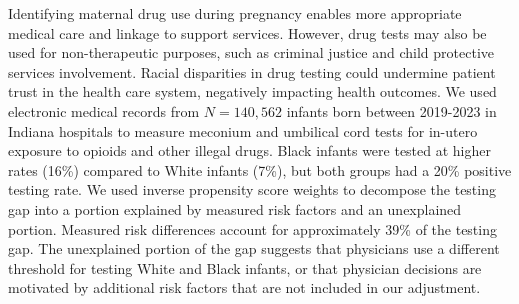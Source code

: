Identifying maternal drug use during pregnancy enables more appropriate medical care and linkage to support services. However, drug tests may also be used for non-therapeutic purposes, such as criminal justice and child protective services involvement. Racial disparities in drug testing could undermine patient trust in the health care system, negatively impacting health outcomes. We used electronic medical records from $N = 140,562$ infants born between 2019-2023 in Indiana hospitals to measure meconium and umbilical cord tests for in-utero exposure to opioids and other illegal drugs. Black infants were tested at higher rates (16\%) compared to White infants (7\%), but both groups had a 20\% positive testing rate. We used inverse propensity score weights to decompose the testing gap into a portion explained by measured risk factors and an unexplained portion. Measured risk differences account for approximately 39\% of the testing gap. The unexplained portion of the gap suggests that physicians use a different threshold for testing White and Black infants, or that physician decisions are motivated by additional risk factors that are not included in our adjustment.

\bigskip
